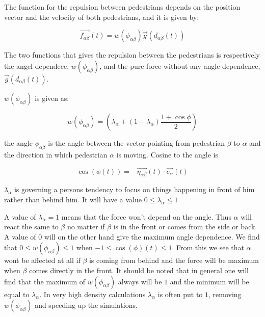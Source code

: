 The function for the repulsion between pedestrians depends on the position vector and the velocity of 
both pedestrians, and it is given by:

\begin{equation}
        \overrightarrow{f_{\alpha \beta }}\left( t \right) = w\left(\phi_{\alpha \beta}\right)\overrightarrow{g}\left(d_{\alpha \beta}(t)\right)
    \label{eq:pedestrianinteraction}
\end{equation}

The two functions that gives the repulsion between the pedestrians is respectively the angel dependece, $ w\left(\phi_{\alpha \beta}\right)$, and the pure force without any angle dependence, $\overrightarrow{g}\left(d_{\alpha \beta}(t)\right)$.

$ w\left(\phi_{\alpha \beta}\right)$ is given as: 

\begin{equation}
    w\left(\phi_{\alpha \beta}\right)=
    \left(
        \lambda_{\alpha} + \left(
            1 - \lambda_{\alpha}
        \right)
		\frac{1+\cos{\phi}}{2}
    \right) 
    \label{angleAB}
\end{equation}

the angle $\phi_{\alpha \beta}$ is the angle between the 
vector pointing from pedestrian $\beta$ to $\alpha$ and the direction in which 
pedestrian $\alpha$ is moving. Cosine to the angle is 

\begin{equation}
\cos \left( \phi \left( t \right) \right)
		= 
	- \overrightarrow{\eta_{\alpha \beta}}
		\left( t \right) 
	\cdot 
\overrightarrow{e_{\alpha}}\left( t \right)
\end{equation}

$\lambda_{\alpha}$ is governing a persons tendency to focus on things happening in front of him 
rather than behind him. It will have a value  $0\leq \lambda_{\alpha}\leq 1$

A value of $\lambda_{\alpha}=1$ means that the force won't depend on the angle. Thus $\alpha$ will react the same to $\beta$ no matter if $\beta$ is in the front or comes from the side or back. A value of $0$ will on the other hand give the maximum angle dependence. We find that $0\leq w\left(\phi_{\alpha \beta}\right)\leq1$ when $-1 \leq \cos \left( \phi \right) \left( t \right) \leq 1$. From this we see that $\alpha$ wont be affected at all if $\beta$ is coming from behind and the force will be maximum when $\beta$ comes directly in the front. It should be noted that in general one will find that the maximum of $w\left(\phi_{\alpha \beta}\right)$ always will be $1$ and the minimum will be equal to $\lambda_{\alpha}$. In very high density calculations $\lambda_{\alpha}$ is often put to $1$, removing $w(\phi_{\alpha \beta})$ and speeding up the simulations.   

